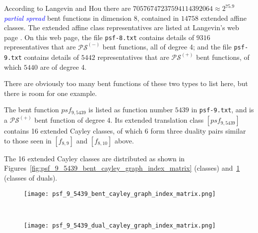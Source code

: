 \documentclass[12pt,a4paper]{article}
\newcommand{\Emph}[1]{\emph{\textcolor{blue}{#1}}}
\begin{document}
According to Langevin and Hou \cite{LanH11counting}
there are $70576747237594114392064 \approx 2^{75.9}$ \Emph{partial spread} bent functions in
dimension 8,
contained in $14758$ extended affine classes.
The extended affine class representatives are listed at Langevin's web page \cite{Lan10psf}.
On this web page,
the file \texttt{psf-8.txt} contains details of $9316$ representatives that are
$\mathcal{PS}^{(-)}$ bent functions, all of degree 4; and
the file \texttt{psf-9.txt} contains details of $5442$ representatives that are
$\mathcal{PS}^{(+)}$ bent functions, of which $5440$ are of degree 4.


There are obviously too many bent functions of these two types to list here, but there is room for one example.

The bent function $psf_{9,5439}$ is listed as function number $5439$ in \texttt{psf-9.txt},
and is a $\mathcal{PS}^{(+)}$ bent function of degree 4.
Its extended translation class $[psf_{9,5439}]$ contains 16 extended Cayley classes,
of which 6 form three duality pairs similar to those seen in $[f_{8,9}]$ and $[f_{8,10}]$ above.

The 16 extended Cayley classes are distributed
as shown in Figures~\ref{fig:psf_9_5439_bent_cayley_graph_index_matrix} (classes) and~\ref{fig:psf_9_5439_dual_cayley_graph_index_matrix}
(classes of duals).

\begin{figure}[!bhpt] %
\centering
\begin{minipage}{.48\textwidth}
  \centering
  \texttt{[image: psf\_9\_5439\_bent\_cayley\_graph\_index\_matrix.png]}
  \label{fig:psf_9_5439_bent_cayley_graph_index_matrix}
\end{minipage}
~~
\begin{minipage}{.48\textwidth}
  \centering
  \texttt{[image: psf\_9\_5439\_dual\_cayley\_graph\_index\_matrix.png]}
  \label{fig:psf_9_5439_dual_cayley_graph_index_matrix}
\end{minipage}%
\end{figure}
\end{document}
